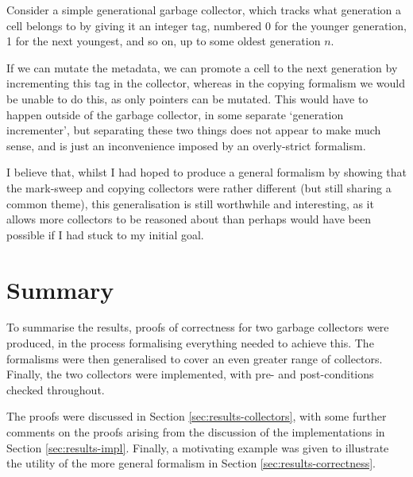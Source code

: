 \begin{example}
  Consider a simple generational garbage collector, which tracks what
  generation a cell belongs to by giving it an integer tag, numbered 0
  for the younger generation, 1 for the next youngest, and so on, up
  to some oldest generation $n$.

  If we can mutate the metadata, we can promote a cell to the next
  generation by incrementing this tag in the collector, whereas in the
  copying formalism we would be unable to do this, as only pointers
  can be mutated. This would have to happen outside of the garbage
  collector, in some separate `generation incrementer', but
  separating these two things does not appear to make much sense, and
  is just an inconvenience imposed by an overly-strict formalism.
\end{example}

I believe that, whilst I had hoped to produce a general formalism by
showing that the mark-sweep and copying collectors were rather
different (but still sharing a common theme), this generalisation is
still worthwhile and interesting, as it allows more collectors to be
reasoned about than perhaps would have been possible if I had stuck to
my initial goal.

\section{Summary}
\label{sec:results-summary}

To summarise the results, proofs of correctness for two garbage
collectors were produced, in the process formalising everything needed
to achieve this. The formalisms were then generalised to cover an even
greater range of collectors. Finally, the two collectors were
implemented, with pre- and post-conditions checked throughout.

The proofs were discussed in Section \ref{sec:results-collectors},
with some further comments on the proofs arising from the discussion
of the implementations in Section \ref{sec:results-impl}. Finally, a
motivating example was given to illustrate the utility of the more
general formalism in Section \ref{sec:results-correctness}.

